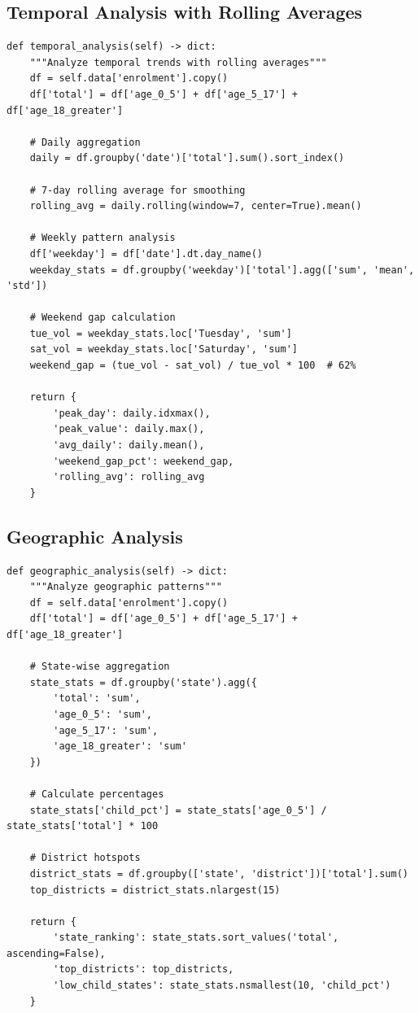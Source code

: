 \documentclass[12pt,a4paper]{article}
\begin{document}
\subsection{Temporal Analysis with Rolling Averages}

\begin{lstlisting}[caption={Temporal Trend Analysis}]
def temporal_analysis(self) -> dict:
    """Analyze temporal trends with rolling averages"""
    df = self.data['enrolment'].copy()
    df['total'] = df['age_0_5'] + df['age_5_17'] + df['age_18_greater']
    
    # Daily aggregation
    daily = df.groupby('date')['total'].sum().sort_index()
    
    # 7-day rolling average for smoothing
    rolling_avg = daily.rolling(window=7, center=True).mean()
    
    # Weekly pattern analysis
    df['weekday'] = df['date'].dt.day_name()
    weekday_stats = df.groupby('weekday')['total'].agg(['sum', 'mean', 'std'])
    
    # Weekend gap calculation
    tue_vol = weekday_stats.loc['Tuesday', 'sum']
    sat_vol = weekday_stats.loc['Saturday', 'sum']
    weekend_gap = (tue_vol - sat_vol) / tue_vol * 100  # 62%
    
    return {
        'peak_day': daily.idxmax(),
        'peak_value': daily.max(),
        'avg_daily': daily.mean(),
        'weekend_gap_pct': weekend_gap,
        'rolling_avg': rolling_avg
    }
\end{lstlisting}

\subsection{Geographic Analysis}

\begin{lstlisting}[caption={Geographic Pattern Detection}]
def geographic_analysis(self) -> dict:
    """Analyze geographic patterns"""
    df = self.data['enrolment'].copy()
    df['total'] = df['age_0_5'] + df['age_5_17'] + df['age_18_greater']
    
    # State-wise aggregation
    state_stats = df.groupby('state').agg({
        'total': 'sum',
        'age_0_5': 'sum',
        'age_5_17': 'sum',
        'age_18_greater': 'sum'
    })
    
    # Calculate percentages
    state_stats['child_pct'] = state_stats['age_0_5'] / state_stats['total'] * 100
    
    # District hotspots
    district_stats = df.groupby(['state', 'district'])['total'].sum()
    top_districts = district_stats.nlargest(15)
    
    return {
        'state_ranking': state_stats.sort_values('total', ascending=False),
        'top_districts': top_districts,
        'low_child_states': state_stats.nsmallest(10, 'child_pct')
    }
\end{lstlisting}
\end{document}
